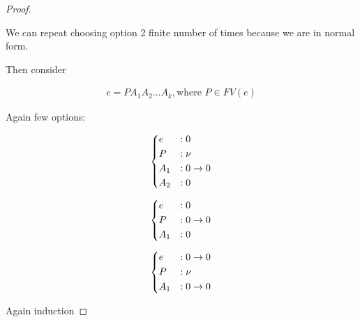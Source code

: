 \documentclass[11pt]{article}
\begin{document}
\begin{proof}
\begin{enumerate}
    \end{enumerate}

    We can repeat choosing option 2 finite number of times because we are in normal form.

    Then consider

    \begin{align*}
        e = P A_1 A_2 ... A_k, \text{where \(P \in FV(e)\)}
    \end{align*}

    Again few options:

    \begin{align*}
        \begin{dcases}
            e &: 0 \\
            P &: \nu \\
            A_1 &: 0 \to 0 \\
            A_2 &: 0
        \end{dcases}
    \end{align*}

    \begin{align*}
        \begin{dcases}
            e &: 0 \\
            P &: 0 \to 0 \\
            A_1 &: 0 \\
        \end{dcases}
    \end{align*}

    \begin{align*}
        \begin{dcases}
            e &: 0 \to 0 \\
            P &: \nu \\
            A_1 &: 0 \to 0 \\
        \end{dcases}
    \end{align*}

    Again induction

\end{proof}
\end{document}
